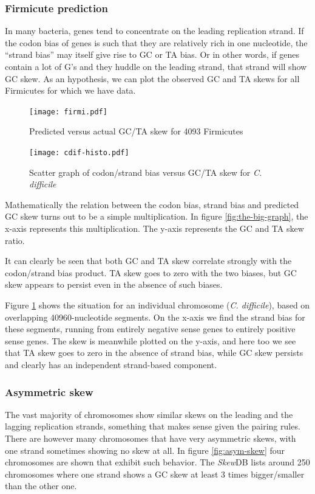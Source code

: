 \documentclass[fleqn,10pt]{wlscirep}
\begin{document}
\subsubsection*{Firmicute prediction}
In many bacteria, genes tend to concentrate on the leading replication strand. If the codon bias of genes is such that they are relatively rich in one nucleotide, the ``strand bias'' may itself give rise to GC or TA bias. Or in other words, if genes contain a lot of G's and they huddle on the leading strand, that strand will show GC skew. As an hypothesis, we can plot the observed GC and TA skews for all Firmicutes for which we have data.


\begin{figure}[ht]
  \centering
    \begin{minipage}[b]{0.45\linewidth}
      \texttt{[image: firmi.pdf]}
      \caption{Predicted versus actual GC/TA skew for 4093 Firmicutes}
      \label{fig:the-big-graph}
    \end{minipage}
    \quad
    \begin{minipage}[b]{0.45\linewidth}
      \texttt{[image: cdif-histo.pdf]}
      \caption{Scatter graph of codon/strand bias versus GC/TA skew for \emph{C. difficile}}
      \label{fig:cdif-scatter}
    \end{minipage}
\end{figure}


Mathematically the relation between the codon bias, strand bias and predicted GC skew turns out to be a simple multiplication. In figure \ref{fig:the-big-graph}, the x-axis represents this multiplication. The y-axis represents the GC and TA skew ratio. 

It can clearly be seen that both GC and TA skew correlate strongly with the codon/strand bias product. TA skew goes to zero with the two biases, but GC skew appears to persist even in the absence of such biases.



Figure \ref{fig:cdif-scatter} shows the situation for an individual chromosome (\emph{C. difficile}), based on overlapping 40960-nucleotide segments. On the x-axis we find the strand bias for these segments, running from entirely negative sense genes to entirely positive sense genes. The skew is meanwhile plotted on the y-axis, and here too we see that TA skew goes to zero in the absence of strand bias, while GC skew persists and clearly has an independent strand-based component.

\subsubsection*{Asymmetric skew}
The vast majority of chromosomes show similar skews on the leading and the lagging replication strands, something that makes sense given the pairing rules. There are however many chromosomes that have very asymmetric skews, with one strand sometimes showing no skew at all. In figure \ref{fig:asym-skew} four chromosomes are shown that exhibit such behavior. The \emph{Skew}DB lists around 250 chromosomes where one strand shows a GC skew at least 3 times bigger/smaller than the other one.
\end{document}
